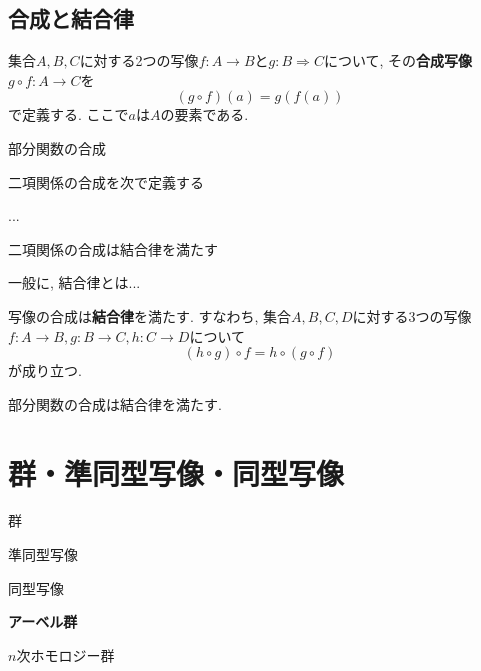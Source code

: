 \documentclass{jsbook}
\theoremstyle{plain}
\begin{document}
\subsection{合成と結合律}
\begin{Def}
集合$A,B,C$に対する2つの写像$f:A\rightarrow B$と$g:B\Rightarrow C$について, その{\bf 合成写像} $g\circ f:A\rightarrow C$を
\[
(g\circ f)(a)=g(f(a))
\]
で定義する. ここで$a$は$A$の要素である.
\end{Def}
\begin{Def}
部分関数の合成
\end{Def}
\begin{Def}
二項関係の合成を次で定義する

...
\end{Def}
\begin{Prop}
二項関係の合成は結合律を満たす
\end{Prop}
\begin{caution}
一般に, 結合律とは...
\end{caution}
\begin{Prop}
写像の合成は{\bf 結合律}を満たす.
すなわち, 集合$A,B,C,D$に対する3つの写像$f:A\rightarrow B, g:B\rightarrow C,
h:C\rightarrow D$について
\[
(h\circ g)\circ f=h\circ(g\circ f)
\]
が成り立つ.
\end{Prop}
\begin{Prop}
部分関数の合成は結合律を満たす.
\end{Prop}
\section{群・準同型写像・同型写像}
\begin{Def}
群
\end{Def}
\begin{Def}
準同型写像
\end{Def}
\begin{Def}
同型写像
\end{Def}
\begin{Def}
{\bf アーベル群}
\end{Def}
\begin{Def}
$n$次ホモロジー群
\end{Def}
\end{document}
